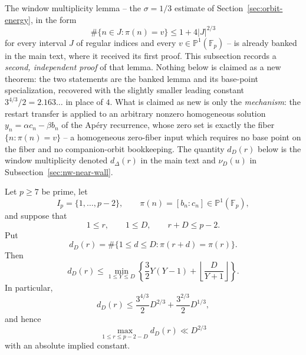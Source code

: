 The window multiplicity lemma -- the $\sigma=1/3$ estimate of
Section~\ref{sec:orbit-energy}, in the form
\[
 \#\{n\in J:\pi(n)=v\}\le1+4|J|^{2/3}
\]
for every interval $J$ of regular indices and every
$v\in\mathbb P^1(\mathbb F_p)$ -- is already banked in the main text,
where it received its first proof.  This subsection records a
\emph{second, independent proof} of that lemma.  Nothing below is
claimed as a new theorem: the two statements are the banked lemma and
its base-point specialization, recovered with the slightly smaller
leading constant $3^{4/3}/2=2.163\ldots$ in place of $4$.  What is
claimed as new is only the \emph{mechanism}: the restart transfer is
applied to an arbitrary nonzero homogeneous solution
$y_n=\alpha c_n-\beta b_n$ of the Ap\'ery recurrence, whose zero set is
exactly the fiber $\{n:\pi(n)=v\}$ -- a homogeneous zero-fiber input
which requires no base point on the fiber and no companion-orbit
bookkeeping.  The quantity $d_D(r)$ below is the window multiplicity
denoted $d_\Delta(r)$ in the main text and $\nu_D(u)$ in
Subsection~\ref{sec:nw-near-wall}.

\begin{proposition}
\label{thm:br-base-return}
Let $p\geq 7$ be prime, let
\[
 I_p=\{1,\ldots,p-2\},
 \qquad
 \pi(n)=[b_n:c_n]\in\mathbb P^1(\mathbb F_p),
\]
and suppose that
\[
 1\leq r,
 \qquad
 1\leq D,
 \qquad
 r+D\leq p-2.
\]
Put
\[
 d_D(r)=\#\{1\leq d\leq D:\pi(r+d)=\pi(r)\}.
\]
Then
\begin{equation}
 d_D(r)
 \leq
 \min_{1\leq Y\leq D}
 \left\{
   \frac32Y(Y-1)
   +\left\lfloor\frac{D}{Y+1}\right\rfloor
 \right\}.
 \label{eq:br-base-min}
\end{equation}
In particular,
\begin{equation}
 d_D(r)
 \leq
 \frac{3^{4/3}}2D^{2/3}
 +\frac{3^{2/3}}2D^{1/3},
 \label{eq:br-base-explicit}
\end{equation}
and hence
\[
 \max_{1\leq r\leq p-2-D}d_D(r)\ll D^{2/3}
\]
with an absolute implied constant.
\end{proposition}


